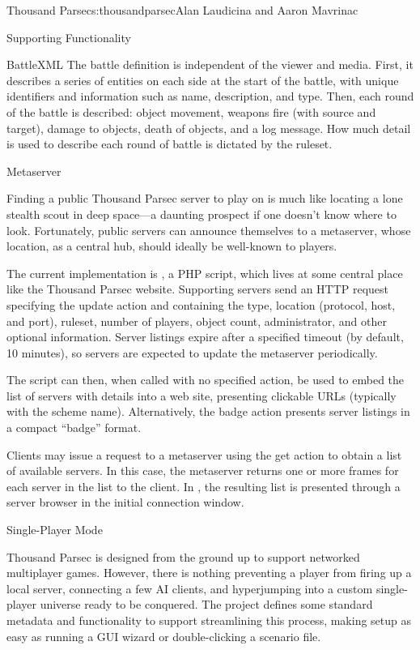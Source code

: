 \begin{aosachapter}{Thousand Parsec}{s:thousandparsec}{Alan Laudicina and Aaron Mavrinac}
\begin{aosasect1}{Supporting Functionality}
\begin{aosasect2}{BattleXML}
The battle definition is independent of the viewer and media. First,
it describes a series of entities on each side at the start of the
battle, with unique identifiers and information such as name,
description, and type. Then, each round of the battle is described:
object movement, weapons fire (with source and target), damage to
objects, death of objects, and a log message. How much detail is used
to describe each round of battle is dictated by the ruleset.

\end{aosasect2}

\begin{aosasect2}{Metaserver}

Finding a public Thousand Parsec server to play on 
is much like locating a lone stealth scout in deep space---a
daunting prospect if one doesn't know where to look. Fortunately,
public servers can announce themselves to a metaserver, whose
location, as a central hub, should ideally be well-known to players.

The current implementation is , a PHP script,
which lives at some central place like the Thousand Parsec
website. Supporting servers send an HTTP request specifying the update
action and containing the type, location (protocol, host, and port),
ruleset, number of players, object count, administrator, and other
optional information. Server listings expire after a specified timeout
(by default, 10 minutes), so servers are expected to update the
metaserver periodically.

The script can then, when called with no specified action, be used to
embed the list of servers with details into a web site, presenting
clickable URLs (typically with the  scheme
name). Alternatively, the badge action presents server listings in a
compact ``badge'' format.

Clients may issue a request to a metaserver using the get action to
obtain a list of available servers. In this case, the metaserver
returns one or more  frames for each server in the list to
the client. In , the resulting list is presented
through a server browser in the initial connection window.

\end{aosasect2}

\begin{aosasect2}{Single-Player Mode}

Thousand Parsec is designed from the ground up to support networked
multiplayer games. However, there is nothing preventing a player from
firing up a local server, connecting a few AI clients, and
hyperjumping into a custom single-player universe ready to be
conquered. The project defines some standard metadata and
functionality to support streamlining this process, making setup as
easy as running a GUI wizard or double-clicking a scenario file.


\end{aosasect2}
\end{aosasect1}
\end{aosachapter}
